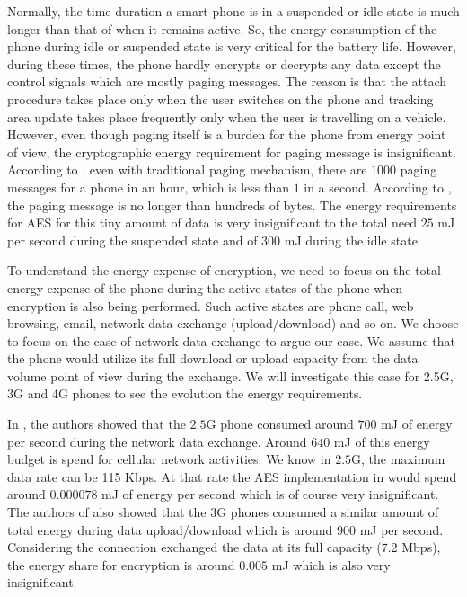 \documentclass[lnicst,sechang,a4paper]{svmultln}
\begin{document}
Normally, the time duration a smart phone is in a suspended or idle state is much longer than that of when it remains active. So, the energy consumption of the phone during idle or suspended state is very critical for the battery life. However, during these times, the phone hardly encrypts or decrypts any data except the control signals which are mostly paging messages. The reason is that the attach procedure takes place only when the user switches on the phone and tracking area update takes place frequently only when the user is travelling on a vehicle. However, even though paging itself is a burden for the phone from energy point of view, the cryptographic energy requirement for paging message is insignificant. According to \cite{Nokia_2013}, even with traditional paging mechanism, there are $1000$ paging messages for a phone in an hour, which is less than $1$ in a second. According to \cite{3GPP_TS_36_331}, the paging message is no longer than hundreds of bytes. The energy requirements for AES for this tiny amount of data is very insignificant to the total need $25$ mJ per second during the suspended state and of 300 mJ during the idle state.

To understand the energy expense of encryption, we need to focus on the total energy expense of the phone during the active states of the phone when encryption is also being performed. Such active states are phone call, web browsing, email, network data exchange (upload/download) and so on. We choose to focus on the case of network data exchange to argue our case. We assume that the phone would utilize its full download or upload capacity from the data volume point of view during the exchange. We will investigate this case for 2.5G, 3G and 4G phones to see the evolution the energy requirements.

In \cite{Usenix_2010}, the authors showed that the $2.5$G phone consumed around $700$ mJ of energy per second during the network data exchange. Around $640$ mJ of this energy budget is spend for cellular network activities. We know in $2.5$G, the maximum data rate can be 115 Kbps. At that rate the AES implementation in \cite{Ruhr_2009} would spend around $0.000078$ mJ of energy per second which is of course very insignificant. The authors of \cite{Usenix_2010} also showed that the 3G phones consumed a similar amount of total energy during data upload/download which is around $900$ mJ per second. Considering the connection exchanged the data at its full capacity (7.2 Mbps), the energy share for encryption is around $0.005$ mJ which is also very insignificant. 
\end{document}
